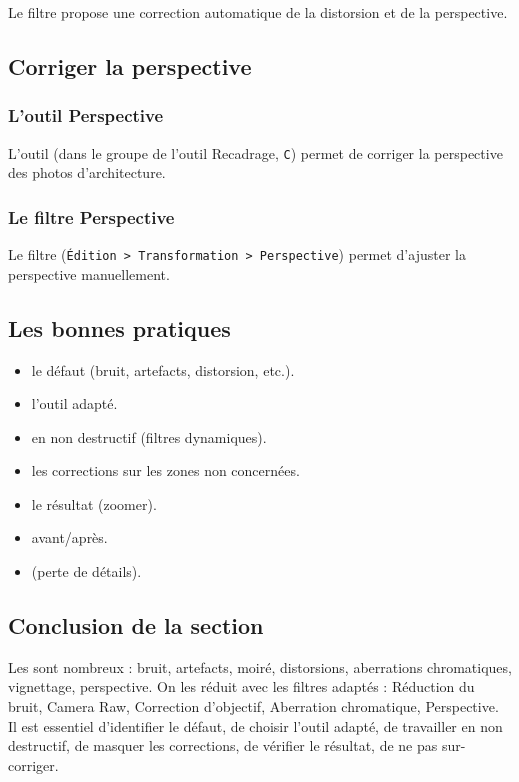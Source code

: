 Le filtre  propose une correction automatique de la distorsion et de la perspective.

\subsection{Corriger la perspective}

\subsubsection{L'outil Perspective}

L'outil  (dans le groupe de l'outil Recadrage, \texttt{C}) permet de corriger la perspective des photos d'architecture.

\subsubsection{Le filtre Perspective}

Le filtre  (\texttt{Édition > Transformation > Perspective}) permet d'ajuster la perspective manuellement.

\subsection{Les bonnes pratiques}

\begin{itemize}
    \item {} le défaut (bruit, artefacts, distorsion, etc.).
    \item {} l'outil adapté.
    \item {} en non destructif (filtres dynamiques).
    \item {} les corrections sur les zones non concernées.
    \item {} le résultat (zoomer).
    \item {} avant/après.
    \item {} (perte de détails).
\end{itemize}

\subsection*{Conclusion de la section}

Les  sont nombreux : bruit, artefacts, moiré, distorsions, aberrations chromatiques, vignettage, perspective. On les réduit avec les filtres adaptés : Réduction du bruit, Camera Raw, Correction d'objectif, Aberration chromatique, Perspective. Il est essentiel d'identifier le défaut, de choisir l'outil adapté, de travailler en non destructif, de masquer les corrections, de vérifier le résultat, de ne pas sur-corriger.

